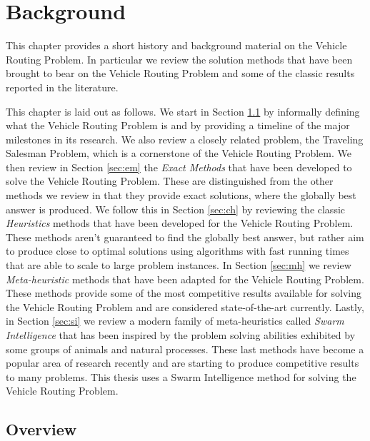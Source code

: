 
\chapter{Background}
\label{chap:background}

This chapter provides a short history and background material on the Vehicle Routing Problem. In particular we review the solution methods that have been brought to bear on the Vehicle Routing Problem and some of the classic results reported in the literature. 

This chapter is laid out as follows. We start in Section \ref{sec:vo} by informally defining what the Vehicle Routing Problem is and by providing a timeline of the major milestones in its research. We also review a closely related problem, the Traveling Salesman Problem, which is a cornerstone of the Vehicle Routing Problem. We then review in Section \ref{sec:em} the \emph{Exact Methods} that have been developed to solve the Vehicle Routing Problem. These are distinguished from the other methods we review in that they provide exact solutions, where the globally best answer is produced. We follow this in Section \ref{sec:ch} by reviewing the classic \emph{Heuristics} methods that have been developed for the Vehicle Routing Problem. These methods aren't guaranteed to find the globally best answer, but rather aim to produce close to optimal solutions using algorithms with fast running times that are able to scale to large problem instances. In Section \ref{sec:mh} we review \emph{Meta-heuristic} methods that have been adapted for the Vehicle Routing Problem. These methods provide some of the most competitive results available for solving the Vehicle Routing Problem and are considered state-of-the-art currently. Lastly, in Section \ref{sec:si} we review a modern family of meta-heuristics called \emph{Swarm Intelligence} that has been inspired by the problem solving abilities exhibited by some groups of animals and natural processes. These last methods have become a popular area of research recently and are starting to produce competitive results to many problems. This thesis uses a Swarm Intelligence method for solving the Vehicle Routing Problem.


\section{Overview}
\label{sec:vo}

